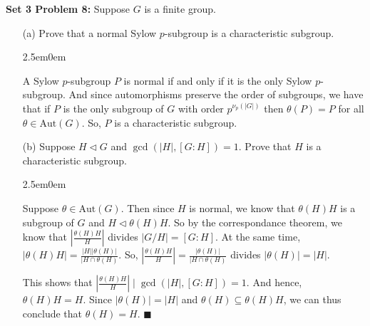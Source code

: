 \documentclass{book}
\newcommand{\HexOne}{%
   \color{Purple}%
   \fontsize{12}{13}\selectfont%
}
\newenvironment{myIndent}{%
   \begin{adjustwidth}{2.5em}{0em}%
}{%
   \end{adjustwidth}%
}
\newcommand{\blab}[1]{\textbf{#1}}
\newcommand{\Aut}{\mathrm{Aut}}
\newcommand{\divides}{\mathop{\mid}}
\newcommand{\retTwo}{\hfill\bigbreak}
\begin{document}
\blab{Set 3 Problem 8:} Suppose $G$ is a finite group.
\begin{enumerate}
	\item[(a)] Prove that a normal Sylow $p$-subgroup is a characteristic subgroup.\newpage
	
	\begin{myIndent}\HexOne
		A Sylow $p$-subgroup $P$ is normal if and only if it is the only Sylow $p$-subgroup. And since automorphisms preserve the order of subgroups, we have that if $P$ is the only subgroup of $G$ with order $p^{\nu_p(|G|)}$ then $\theta(P) = P$ for all $\theta \in \Aut(G)$. So, $P$ is a characteristic subgroup.\retTwo
	\end{myIndent}
	
	\item[(b)] Suppose $H \lhd G$ and $\gcd(|H|, [G : H]) = 1$. Prove that $H$ is a characteristic subgroup.
	
	\begin{myIndent}\HexOne
		Suppose $\theta \in \Aut(G)$. Then since $H$ is normal, we know that $\theta(H)H$ is a subgroup of $G$ and $H \lhd \theta(H)H$. So by the correspondance theorem, we know that $|\frac{\theta(H)H}{H}|$ divides $|G/H| = [G : H]$. At the same time, $|\theta(H)H| = \frac{|H||\theta(H)|}{|H \cap \theta(H)}$. So, $|\frac{\theta(H)H}{H}| = \frac{|\theta(H)|}{|H \cap \theta(H)}$ divides $|\theta(H)| = |H|$.\retTwo

		This shows that $|\frac{\theta(H)H}{H}| \divides \gcd(|H|, [G : H]) = 1$. And hence, $\theta(H)H = H$. Since $|\theta(H)| = |H|$ and $\theta(H) \subseteq \theta(H)H$, we can thus conclude that $\theta(H) = H$. $\blacksquare$\retTwo
	\end{myIndent}
\end{enumerate}
\end{document}
